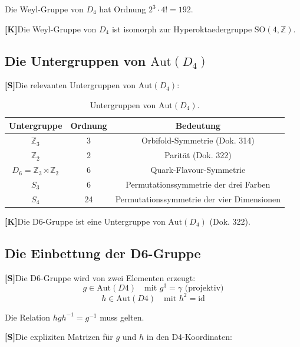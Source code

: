 \documentclass[11pt,a4paper]{article}
\newcommand{\Kstatus}{\textbf{[K]}}
\newcommand{\Sstatus}{\textbf{[S]}}
\begin{document}
	Die Weyl-Gruppe von $D_4$ hat Ordnung $2^3 \cdot 4! = 192$.
	
	\Kstatus Die Weyl-Gruppe von $D_4$ ist isomorph zur Hyperoktaedergruppe $\text{SO}(4, \mathbb{Z})$.
	
	\subsection{Die Untergruppen von $\text{Aut}(D_4)$}
	
	\Sstatus Die relevanten Untergruppen von $\text{Aut}(D_4)$:
	
	\begin{table}[h!]
		\centering
		\caption{Untergruppen von $\text{Aut}(D_4)$.}
		\label{tab:subgroups}
		\begin{tabular}{c c c}
			\toprule
			\textbf{Untergruppe} & \textbf{Ordnung} & \textbf{Bedeutung} \\
			\midrule
			$\mathbb{Z}_3$ & 3 & Orbifold-Symmetrie (Dok. 314) \\
			$\mathbb{Z}_2$ & 2 & Parität (Dok. 322) \\
			$D_6 = \mathbb{Z}_3 \rtimes \mathbb{Z}_2$ & 6 & Quark-Flavour-Symmetrie \\
			$S_3$ & 6 & Permutationssymmetrie der drei Farben \\
			$S_4$ & 24 & Permutationssymmetrie der vier Dimensionen \\
			\bottomrule
		\end{tabular}
	\end{table}
	
	\Kstatus Die D6-Gruppe ist eine Untergruppe von $\text{Aut}(D_4)$ (Dok. 322).
	
	\subsection{Die Einbettung der D6-Gruppe}
	
	\Sstatus Die D6-Gruppe wird von zwei Elementen erzeugt:
	\begin{equation}
		g \in \text{Aut}(D4) \quad \text{mit } g^3 = \gamma \text{ (projektiv)}
	\end{equation}
	\begin{equation}
		h \in \text{Aut}(D4) \quad \text{mit } h^2 = \text{id}
	\end{equation}
	
	Die Relation $h g h^{-1} = g^{-1}$ muss gelten.
	
	\Sstatus Die expliziten Matrizen für $g$ und $h$ in den D4-Koordinaten:
	
\end{document}
